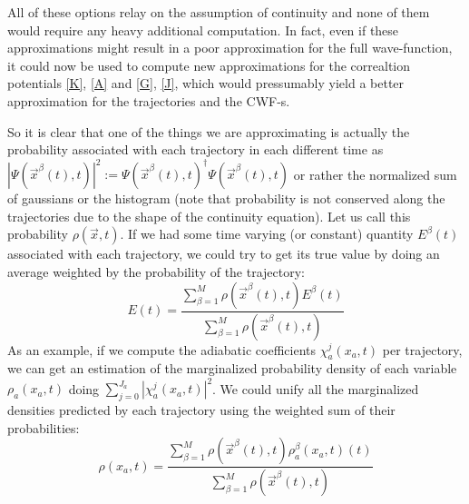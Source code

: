 \documentclass[11pt, a4paper]{article} %
\begin{document}
All of these options relay on the assumption of continuity and none of them would require any heavy additional computation. In fact, even if these approximations might result in a poor approximation for the full wave-function, it could now be used to compute new approximations for the correaltion potentials \ref{K}, \ref{A} and \ref{G}, \ref{J}, which would pressumably yield a better approximation for the trajectories and the CWF-s. 


So it is clear that one of the things we are approximating is actually the probability associated with each trajectory in each different time as $|\Psi(\vec{x}^\beta (t),t)|^2:=\Psi(\vec{x}^\beta (t),t)^\dagger \Psi(\vec{x}^\beta (t),t)$ or rather the normalized sum of gaussians or the histogram (note that probability is not conserved along the trajectories due to the shape of the continuity equation). Let us call this probability $\rho(\vec{x},t)$. If we had some time varying (or constant) quantity $E^\beta(t)$ associated with each trajectory, we could try to get its true value by doing an average weighted by the probability of the trajectory:
$$
E(t)=\frac{\sum_{\beta=1}^M \rho(\vec{x}^\beta(t),t) E^\beta(t)}{\sum_{\beta=1}^M \rho(\vec{x}^\beta(t),t)}
$$
As an example, if we compute the adiabatic coefficients $\chi^j_a(x_a,t)$ per trajectory, we can get an estimation of the marginalized probability density of each variable $\rho_a(x_a,t)$ doing $\sum_{j=0}^{J_a}|\chi^j_a(x_a,t)|^2$. We could unify all the marginalized densities predicted by each trajectory using the weighted sum of their probabilities:
$$
\rho(x_a,t)=\frac{\sum_{\beta=1}^M \rho(\vec{x}^\beta(t),t) \rho_a^\beta(x_a,t)(t)}{\sum_{\beta=1}^M \rho(\vec{x}^\beta(t),t)}
$$

\end{document}
